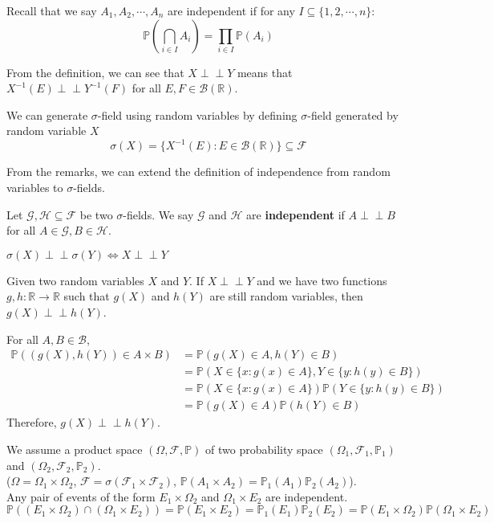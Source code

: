 \documentclass{huhtakm-template-book}
\newcommand{\independent}{\perp\!\!\!\perp}
\newcommand{\prob}{\mathbb{P}}
\begin{document}
Recall that we say $A_{1},A_{2},\cdots,A_{n}$ are independent if for any $I\subseteq\{1,2,\cdots,n\}$:
\begin{equation*}
	\prob\left(\bigcap_{i\in I}A_{i}\right)=\prod_{i\in I}\prob(A_{i})
\end{equation*}
\begin{rem}
	From the definition, we can see that $X\independent Y$ means that $X^{-1}(E)\independent Y^{-1}(F)$ for all $E,F\in\mathcal{B}(\mathbb{R})$.
\end{rem}
\begin{rem}
	We can generate $\sigma$-field using random variables by defining $\sigma$-field generated by random variable $X$
	\begin{equation*}
		\sigma(X)=\{X^{-1}(E):E\in\mathcal{B}(\mathbb{R})\}\subseteq\mathcal{F}
	\end{equation*}
\end{rem}
From the remarks, we can extend the definition of independence from random variables to $\sigma$-fields.
\begin{defn}
	Let $\mathcal{G},\mathcal{H}\subseteq\mathcal{F}$ be two $\sigma$-fields. We say $\mathcal{G}$ and $\mathcal{H}$ are \textbf{independent} if $A\independent B$ for all $A\in\mathcal{G},B\in\mathcal{H}$.
\end{defn}
\begin{rem}
	$\sigma(X)\independent\sigma(Y)\iff X\independent Y$
\end{rem}
\begin{thm}
	Given two random variables $X$ and $Y$. If $X\independent Y$ and we have two functions $g,h:\mathbb{R}\to\mathbb{R}$ such that $g(X)$ and $h(Y)$ are still random variables, then $g(X)\independent h(Y)$.
\end{thm}
\begin{proofing}
	For all $A,B\in\mathcal{B}$,
	\begin{align*}
		\prob((g(X),h(Y))\in A\times B)&=\prob(g(X)\in A,h(Y)\in B)\\
		&=\prob(X\in\{x:g(x)\in A\},Y\in\{y:h(y)\in B\})\\
		&=\prob(X\in\{x:g(x)\in A\})\prob(Y\in\{y:h(y)\in B\})\\
		&=\prob(g(X)\in A)\prob(h(Y)\in B)
	\end{align*}
	Therefore, $g(X)\independent h(Y)$.
\end{proofing}
\begin{rem}
	We assume a product space $(\Omega,\mathcal{F},\prob)$ of two probability space $(\Omega_{1},\mathcal{F}_{1},\prob_{1})$ and $(\Omega_{2},\mathcal{F}_{2},\prob_{2})$.\\
	($\Omega=\Omega_{1}\times\Omega_{2}$, $\mathcal{F}=\sigma(\mathcal{F}_{1}\times\mathcal{F}_{2})$, $\prob(A_{1}\times A_{2})=\prob_{1}(A_{1})\prob_{2}(A_{2})$).\\
	Any pair of events of the form $E_{1}\times\Omega_{2}$ and $\Omega_{1}\times E_{2}$ are independent.
	\begin{equation*}
		\prob((E_{1}\times\Omega_{2})\cap(\Omega_{1}\times E_{2}))=\prob(E_{1}\times E_{2})=\prob_{1}(E_{1})\prob_{2}(E_{2})=\prob(E_{1}\times\Omega_{2})\prob(\Omega_{1}\times E_{2})
	\end{equation*}
\end{rem}
\end{document}
